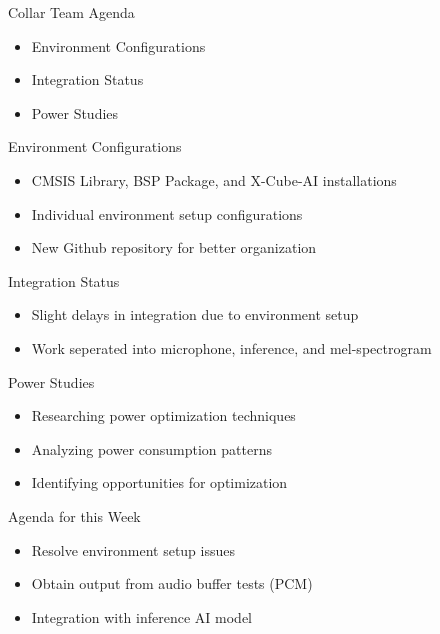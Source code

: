 \begin{frame}{Collar Team Agenda}
    \begin{itemize}
        \item Environment Configurations
        \item Integration Status
        \item Power Studies
    \end{itemize}
\end{frame}

\begin{frame}{Environment Configurations}
    \begin{itemize}
        \item CMSIS Library, BSP Package, and X-Cube-AI installations
        \item Individual environment setup configurations
        \item New Github repository for better organization
    \end{itemize}
\end{frame}

\begin{frame}{Integration Status}
    \begin{itemize}
        \item Slight delays in integration due to environment setup
        \item Work seperated into microphone, inference, and mel-spectrogram
    \end{itemize}   
\end{frame}

\begin{frame}{Power Studies}
    \begin{itemize}
        \item Researching power optimization techniques
        \item Analyzing power consumption patterns
        \item Identifying opportunities for optimization
    \end{itemize}
\end{frame}

\begin{frame}{Agenda for this Week}
    \begin{itemize}
        \item Resolve environment setup issues
        \item Obtain output from audio buffer tests (PCM)
        \item Integration with inference AI model
    \end{itemize}    
\end{frame}

